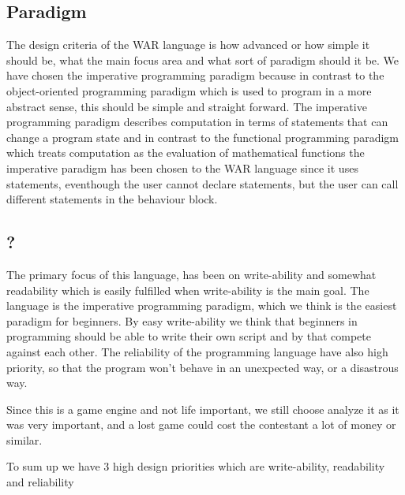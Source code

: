 \subsection{Paradigm}
The design criteria of the WAR language is how advanced or how simple it should be, what the main focus area and what sort of paradigm should it be. We have chosen the imperative programming paradigm because in contrast to the object-oriented programming paradigm which is used to program in a more abstract sense, this should be simple and straight forward. The imperative programming paradigm describes computation in terms of statements that can change a program state and in contrast to the functional programming paradigm which treats computation as the evaluation of mathematical functions the imperative paradigm has been chosen to the WAR language since it uses statements, eventhough the user cannot declare statements, but the user can call different statements in the behaviour block. 

\subsection{?}
The primary focus of this language, has been on write-ability and somewhat readability which is easily fulfilled when write-ability is the main goal. The language is the imperative programming paradigm, which we think is the easiest paradigm for beginners. By easy write-ability we think that beginners in programming should be able to write their own script and by that compete against each other. The reliability of the programming language have also high priority, so that the program won't behave in an unexpected way, or a disastrous way.

 
Since this is a game engine and not life important, we still choose analyze it as it was very important, and a lost game could cost the contestant a lot of money or similar.

To sum up we have 3 high design priorities which are write-ability, readability and reliability
